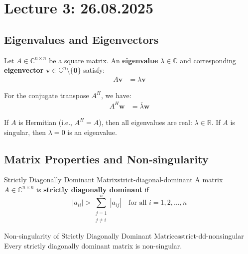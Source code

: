 \section{Lecture 3: 26.08.2025}

\subsection{Eigenvalues and Eigenvectors}

Let $A \in \mathbb{C}^{n \times n}$ be a square matrix. An \textbf{eigenvalue} $\lambda \in \mathbb{C}$ and corresponding \textbf{eigenvector} $\mathbf{v} \in \mathbb{C}^n \setminus \{\mathbf{0}\}$ satisfy:
\begin{align}
    A \mathbf{v} &= \lambda \mathbf{v} \label{eq:eigenvalue-equation}
\end{align}

For the conjugate transpose $A^H$, we have:
\begin{align}
    A^H \mathbf{w} &= \overline{\lambda} \mathbf{w} \label{eq:conjugate-eigenvalue}
\end{align}

\begin{remark}{}{}
    If $A$ is Hermitian (i.e., $A^H = A$), then all eigenvalues are real: $\lambda \in \mathbb{R}$.
    If $A$ is singular, then $\lambda = 0$ is an eigenvalue.
\end{remark}

\subsection{Matrix Properties and Non-singularity}

\begin{definition}{Strictly Diagonally Dominant Matrix}{strict-diagonal-dominant}
    A matrix $A \in \mathbb{C}^{n \times n}$ is \textbf{strictly diagonally dominant} if
    \begin{equation}
        |a_{ii}| > \sum_{\substack{j=1 \\ j \neq i}}^n |a_{ij}| \quad \text{for all } i = 1, 2, \ldots, n
    \end{equation}
\end{definition}

\begin{theorem}{Non-singularity of Strictly Diagonally Dominant Matrices}{strict-dd-nonsingular}
    Every strictly diagonally dominant matrix is non-singular.
\end{theorem}


